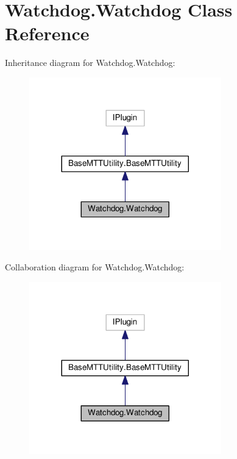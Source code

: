 \hypertarget{class_watchdog_1_1_watchdog}{\section{Watchdog.\-Watchdog Class Reference}
\label{class_watchdog_1_1_watchdog}
}


Inheritance diagram for Watchdog.\-Watchdog\-:
\nopagebreak
\begin{figure}[H]
\begin{center}
\leavevmode
\includegraphics[width=236pt]{class_watchdog_1_1_watchdog__inherit__graph}
\end{center}
\end{figure}


Collaboration diagram for Watchdog.\-Watchdog\-:
\nopagebreak
\begin{figure}[H]
\begin{center}
\leavevmode
\includegraphics[width=236pt]{class_watchdog_1_1_watchdog__coll__graph}
\end{center}
\end{figure}
